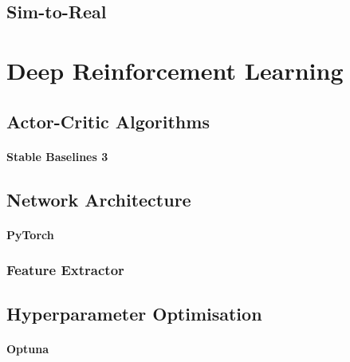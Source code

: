 \subsection{Sim-to-Real}





\section{Deep Reinforcement Learning}


\subsection{Actor-Critic Algorithms}

\paragraph{Stable Baselines 3}


\subsection{Network Architecture}

\paragraph{PyTorch}

\subsubsection{Feature Extractor}


\subsection{Hyperparameter Optimisation}

\paragraph{Optuna}

